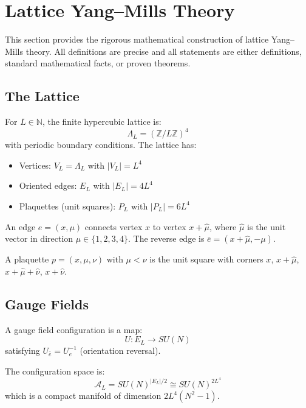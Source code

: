 \section{Lattice Yang--Mills Theory}
\label{sec:lattice}
\label{sec:fundamental-proof}

This section provides the rigorous mathematical construction of lattice Yang--Mills 
theory. All definitions are precise and all statements are either definitions, 
standard mathematical facts, or proven theorems.

\subsection{The Lattice}

\begin{definition}
\label{def:lattice}
For $L \in \mathbb{N}$, the finite hypercubic lattice is:
\[
\Lambda_L = (\mathbb{Z}/L\mathbb{Z})^4
\]
with periodic boundary conditions. The lattice has:
\begin{itemize}
    \item Vertices: $V_L = \Lambda_L$ with $|V_L| = L^4$
    \item Oriented edges: $E_L$ with $|E_L| = 4L^4$
    \item Plaquettes (unit squares): $P_L$ with $|P_L| = 6L^4$
\end{itemize}
\end{definition}

\begin{definition}
An edge $e = (x, \mu)$ connects vertex $x$ to vertex $x + \hat{\mu}$, where 
$\hat{\mu}$ is the unit vector in direction $\mu \in \{1,2,3,4\}$. 
The reverse edge is $\bar{e} = (x + \hat{\mu}, -\mu)$.
\end{definition}

\begin{definition}[Plaquette]
A plaquette $p = (x, \mu, \nu)$ with $\mu < \nu$ is the unit square with corners 
$x$, $x + \hat{\mu}$, $x + \hat{\mu} + \hat{\nu}$, $x + \hat{\nu}$.
\end{definition}

\subsection{Gauge Fields}

\begin{definition}
\label{def:config-space}
A gauge field configuration is a map:
\[
U : E_L \to SU(N)
\]
satisfying $U_{\bar{e}} = U_e^{-1}$ (orientation reversal).

The configuration space is:
\[
\mathcal{A}_L = SU(N)^{|E_L|/2} \cong SU(N)^{2L^4}
\]
which is a compact manifold of dimension $2L^4(N^2-1)$.
\end{definition}

